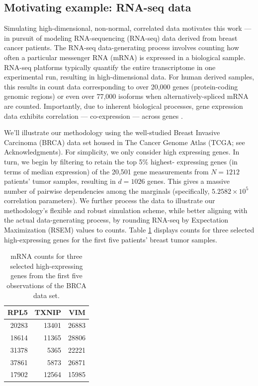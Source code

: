 \documentclass[]{article}
\begin{document}
\hypertarget{motivating-example-rna-seq-data}{%
\subsection{Motivating example: RNA-seq data}\label{motivating-example-rna-seq-data}}

Simulating high-dimensional, non-normal, correlated data motivates this work --- in pursuit of modeling RNA-sequencing (RNA-seq) data \citep{Wang2009b, Conesa2016b} derived from breast cancer patients.
The RNA-seq data-generating process involves counting how often a particular messenger RNA (mRNA) is expressed in a biological sample.
RNA-seq platforms typically quantify the entire transcriptome in one experimental run, resulting in high-dimensional data.
For human derived samples, this results in count data corresponding to over 20,000 genes (protein-coding genomic regions) or even over 77,000 isoforms when alternatively-spliced mRNA are counted.
Importantly, due to inherent biological processes, gene expression data exhibits correlation --- co-expression --- across genes \citep{BE07, Schissler2018}.

We'll illustrate our methodology using the well-studied Breast Invasive Carcinoma (BRCA) data set housed in The Cancer Genome Atlas (TCGA; see Acknowledgments).
For simplicity, we only consider high expressing genes.
In turn, we begin by filtering to retain the top 5\% highest- expressing genes (in terms of median expression) of the 20,501 gene measurements from \(N=1212\) patients' tumor samples, resulting in \(d=1026\) genes.
This gives a massive number of pairwise dependencies among the marginals (specifically, \(\ensuremath{5.2582\times 10^{5}}\) correlation parameters).
We further process the data to illustrate our methodology's flexible and robust simulation scheme, while better aligning with the actual data-generating process, by rounding \citet{Li2011c} RNA-seq by Expectation Maximization (RSEM) values to counts.
Table \ref{tab:ch010-realDataTab} displays counts for three selected high-expressing genes for the first five patients' breast tumor samples.

\begin{table}

\caption{\label{tab:ch010-realDataTab}mRNA counts for three selected high-expressing genes from the first five observations of the BRCA data set.}
\centering
\begin{tabular}[t]{rrr}
\toprule
RPL5 & TXNIP & VIM\\
\midrule
20283 & 13401 & 26883\\
18614 & 11365 & 28806\\
31378 & 5365 & 22221\\
37861 & 5873 & 26871\\
17902 & 12564 & 15985\\
\bottomrule
\end{tabular}
\end{table}
\end{document}
